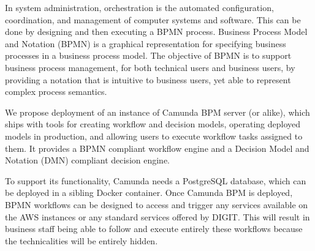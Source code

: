 	In system administration, orchestration is the automated configuration, coordination, and management of computer systems and software. This can be done by designing and then executing a BPMN process. Business Process Model and Notation (BPMN) is a graphical representation for specifying business processes in a business process model. The objective of BPMN is to support business process management, for both technical users and business users, by providing a notation that is intuitive to business users, yet able to represent complex process semantics.

	We propose deployment of an instance of Camunda BPM server (or alike), which ships with tools for creating workflow and decision models, operating deployed models in production, and allowing users to execute workflow tasks assigned to them. It provides a BPMN compliant workflow engine and a Decision Model and Notation (DMN) compliant decision engine. 
	
	To support its functionality, Camunda needs a PostgreSQL database, which can be deployed in a sibling Docker container. Once Camunda BPM is deployed, BPMN workflows can be designed to access and trigger any services available on the AWS instances or any standard services offered by DIGIT. This will result in business staff being able to follow and execute entirely these workflows because the technicalities will be entirely hidden. 
		
	